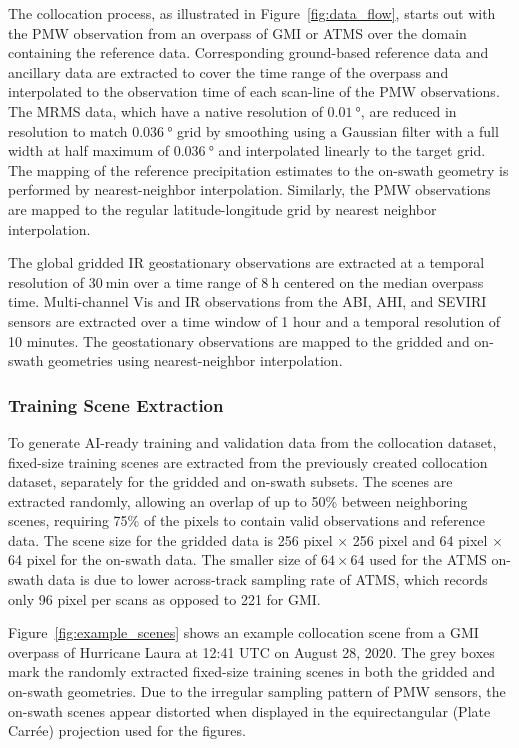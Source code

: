 \documentclass[11pt]{article}
\begin{document}
The collocation process, as illustrated in Figure~\ref{fig:data_flow}, starts
out with the PMW observation from an overpass of GMI or ATMS over the domain
containing the reference data. Corresponding ground-based reference data and
ancillary data are extracted to cover the time range of the overpass and
interpolated to the observation time of each scan-line of the PMW observations.
The MRMS data, which have a native resolution of $\SI{0.01}{\degree}$, are reduced in
resolution to match $\SI{0.036}{\degree}$ grid by smoothing using a Gaussian filter with
a full width at half maximum of $\SI{0.036}{\degree}$ and interpolated linearly to the
target grid. The mapping of the reference precipitation estimates to the
on-swath geometry is performed by nearest-neighbor interpolation. Similarly, the
PMW observations are mapped to the regular latitude-longitude grid by nearest
neighbor interpolation.

The global gridded IR geostationary observations are extracted at a temporal
resolution of $\SI{30}{\minute}$ over a time range of $\SI{8}{\hour}$ centered on the
median overpass time. Multi-channel Vis and IR observations from the ABI, AHI,
and SEVIRI sensors are extracted over a time window of 1 hour and a temporal
resolution of 10 minutes. The geostationary observations are mapped to the
gridded and on-swath geometries using nearest-neighbor interpolation.

\subsubsection{Training Scene Extraction}

To generate AI-ready training and validation data from the collocation dataset,
fixed-size training scenes are extracted from the previously created collocation
dataset, separately for the gridded and on-swath subsets. The scenes are
extracted randomly, allowing an overlap of up to 50\% between neighboring
scenes, requiring 75\% of the pixels to contain valid observations and reference
data. The scene size for the gridded data is 256 pixel $\times$ 256 pixel and 64
pixel $\times$ 64 pixel for the on-swath data. The smaller size of $64 \times
	64$ used for the ATMS on-swath data is due to lower across-track sampling rate
of ATMS, which records only 96 pixel per scans as opposed to 221 for GMI.

Figure~\ref{fig:example_scenes} shows an example collocation scene from a GMI
overpass of Hurricane Laura at 12:41 UTC on August 28, 2020. The grey boxes mark
the randomly extracted fixed-size training scenes in both the gridded and
on-swath geometries. Due to the irregular sampling pattern of PMW sensors, the
on-swath scenes appear distorted when displayed in the equirectangular (Plate
Carrée) projection used for the figures.
\end{document}

